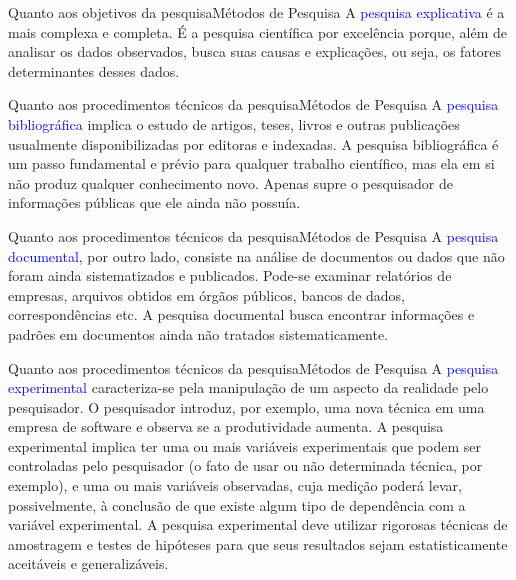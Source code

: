 \documentclass[t]{beamer}
\begin{document}

\begin{ftst}{Quanto aos objetivos da pesquisa}{Métodos de Pesquisa}
\vone
\justifying
A \textcolor{blue}{pesquisa explicativa} é a mais complexa e completa. 
\vone
É a pesquisa científica por excelência porque, além de analisar os dados observados, busca suas causas e explicações, ou seja, os fatores determinantes desses dados.


\end{ftst}


\begin{ftst}{Quanto aos procedimentos técnicos da pesquisa}{Métodos de Pesquisa}
\vone
\justifying
A \textcolor{blue}{pesquisa bibliográfica} implica o estudo de artigos, teses, livros e outras publicações usualmente disponibilizadas por editoras e indexadas.
\vone
A pesquisa bibliográfica é um passo fundamental e prévio para qualquer trabalho científico, mas ela em si não produz qualquer conhecimento novo. Apenas supre o pesquisador de informações públicas que ele ainda não possuía.


\end{ftst}


\begin{ftst}{Quanto aos procedimentos técnicos da pesquisa}{Métodos de Pesquisa}
\vone
\justifying
A \textcolor{blue}{pesquisa documental}, por outro lado, consiste na análise de documentos ou dados que não foram ainda sistematizados e publicados. Pode-se examinar relatórios de empresas, arquivos obtidos em órgãos públicos, bancos de dados, correspondências etc.
\vone
A pesquisa documental busca encontrar informações e padrões em documentos ainda não tratados sistematicamente.

\end{ftst}



\begin{ftst}{Quanto aos procedimentos técnicos da pesquisa}{Métodos de Pesquisa}
\vone
\justifying
A \textcolor{blue}{pesquisa experimental} caracteriza-se pela manipulação de um aspecto da realidade pelo pesquisador. 
\vone
O pesquisador introduz, por exemplo, uma nova técnica em uma empresa de software e observa se a produtividade aumenta. 
\vone
A pesquisa experimental implica ter uma ou mais variáveis experimentais que podem ser controladas pelo pesquisador (o fato de usar ou não determinada técnica, por exemplo), e uma ou mais variáveis observadas, cuja medição poderá levar, possivelmente, à conclusão de que existe algum tipo de dependência com a variável experimental.
\vone
A pesquisa experimental deve utilizar rigorosas técnicas de amostragem e testes de hipóteses para que seus resultados sejam estatisticamente aceitáveis e generalizáveis.

\end{ftst}
\end{document}
